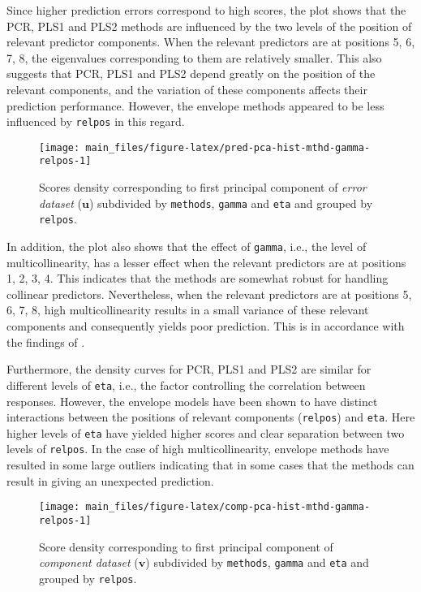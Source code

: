 \documentclass[review]{elsarticle}
\begin{document}
Since higher prediction errors correspond to high scores, the plot shows that the PCR, PLS1 and PLS2 methods are influenced by the two levels of the position of relevant predictor components. When the relevant predictors are at positions 5, 6, 7, 8, the eigenvalues corresponding to them are relatively smaller. This also suggests that PCR, PLS1 and PLS2 depend greatly on the position of the relevant components, and the variation of these components affects their prediction performance. However, the envelope methods appeared to be less influenced by \texttt{relpos} in this regard.



\begin{figure}[!htb]
\texttt{[image: main\_files/figure-latex/pred-pca-hist-mthd-gamma-relpos-1]} \caption{Scores density corresponding to first principal component of \emph{error dataset} (\(\mathbf{u}\)) subdivided by \texttt{methods}, \texttt{gamma} and \texttt{eta} and grouped by \texttt{relpos}.}\label{fig:pred-pca-hist-mthd-gamma-relpos}
\end{figure}

In addition, the plot also shows that the effect of \texttt{gamma}, i.e., the level of multicollinearity, has a lesser effect when the relevant predictors are at positions 1, 2, 3, 4. This indicates that the methods are somewhat robust for handling collinear predictors. Nevertheless, when the relevant predictors are at positions 5, 6, 7, 8, high multicollinearity results in a small variance of these relevant components and consequently yields poor prediction. This is in accordance with the findings of \citet{Helland1994b}.

Furthermore, the density curves for PCR, PLS1 and PLS2 are similar for different levels of \texttt{eta}, i.e., the factor controlling the correlation between responses. However, the envelope models have been shown to have distinct interactions between the positions of relevant components (\texttt{relpos}) and \texttt{eta}. Here higher levels of \texttt{eta} have yielded higher scores and clear separation between two levels of \texttt{relpos}.
In the case of high multicollinearity, envelope methods have resulted in some large outliers indicating that in some cases that the methods can result in giving an unexpected prediction.



\begin{figure}[!htb]
\texttt{[image: main\_files/figure-latex/comp-pca-hist-mthd-gamma-relpos-1]} \caption{Score density corresponding to first principal component of \emph{component dataset} (\(\mathbf{v}\)) subdivided by \texttt{methods}, \texttt{gamma} and \texttt{eta} and grouped by \texttt{relpos}.}\label{fig:comp-pca-hist-mthd-gamma-relpos}
\end{figure}
\end{document}
